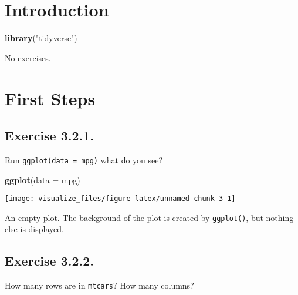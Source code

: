 \documentclass[]{book}
\newenvironment{Shaded}{\begin{snugshade}}{\end{snugshade}}
\newcommand{\DataTypeTok}[1]{\textcolor[rgb]{0.13,0.29,0.53}{#1}}
\newcommand{\KeywordTok}[1]{\textcolor[rgb]{0.13,0.29,0.53}{\textbf{#1}}}
\newcommand{\NormalTok}[1]{#1}
\newcommand{\StringTok}[1]{\textcolor[rgb]{0.31,0.60,0.02}{#1}}
\theoremstyle{plain}
\theoremstyle{remark}
\theoremstyle{definition}
\theoremstyle{definition}
\theoremstyle{definition}
\theoremstyle{remark}
\begin{document}
\hypertarget{introduction-1}{%
\section{Introduction}\label{introduction-1}}

\begin{Shaded}
\begin{Highlighting}[]
\KeywordTok{library}\NormalTok{(}\StringTok{"tidyverse"}\NormalTok{)}
\end{Highlighting}
\end{Shaded}

No exercises.

\hypertarget{first-steps}{%
\section{First Steps}\label{first-steps}}

\hypertarget{exercise-3.2.1.}{%
\subsection*{\texorpdfstring{Exercise
{3.2.1}.}{Exercise 3.2.1.}}\label{exercise-3.2.1.}}

Run \texttt{ggplot(data\ =\ mpg)} what do you see?

\begin{Shaded}
\begin{Highlighting}[]
\KeywordTok{ggplot}\NormalTok{(}\DataTypeTok{data =}\NormalTok{ mpg)}
\end{Highlighting}
\end{Shaded}

\begin{center}\texttt{[image: visualize\_files/figure-latex/unnamed-chunk-3-1]} \end{center}

An empty plot. The background of the plot is created by
\texttt{ggplot()}, but nothing else is displayed.

\hypertarget{exercise-3.2.2.}{%
\subsection*{\texorpdfstring{Exercise
{3.2.2}.}{Exercise 3.2.2.}}\label{exercise-3.2.2.}}

How many rows are in \texttt{mtcars}? How many columns?
\end{document}
